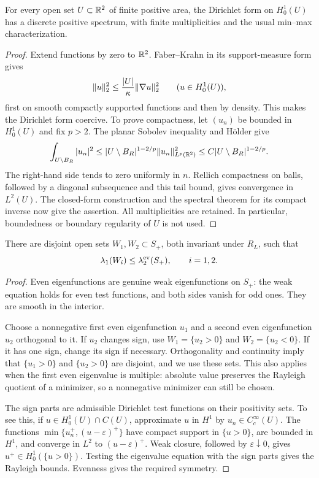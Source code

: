 \begin{lemma}\label{lem:finite-area}
For every open set $U\subset\mathbb R^2$ of finite positive area, the Dirichlet form on $H^1_0(U)$ has a discrete positive spectrum, with finite multiplicities and the usual min--max characterization.
\end{lemma}
\begin{proof}
Extend functions by zero to $\mathbb R^2$. Faber--Krahn in its support-measure form gives
\[
 \lVert u\rVert_2^2\le\frac{|U|}{\kappa}\lVert\nabla u\rVert_2^2
 \qquad(u\in H^1_0(U)),
\]
first on smooth compactly supported functions and then by density. This makes the Dirichlet form coercive. To prove compactness, let $(u_n)$ be bounded in $H^1_0(U)$ and fix $p>2$. The planar Sobolev inequality and H\"older give
\[
 \int_{U\setminus B_R}|u_n|^2
 \le |U\setminus B_R|^{1-2/p}\lVert u_n\rVert_{L^p(\mathbb R^2)}^2
 \le C|U\setminus B_R|^{1-2/p}.
\]
The right-hand side tends to zero uniformly in $n$. Rellich compactness on balls, followed by a diagonal subsequence and this tail bound, gives convergence in $L^2(U)$. The closed-form construction and the spectral theorem for its compact inverse now give the assertion. All multiplicities are retained. In particular, boundedness or boundary regularity of $U$ is not used.
\end{proof}


\begin{lemma}\label{lem:cores}
There are disjoint open sets $W_1,W_2\subset S_+$, both invariant under $R_L$, such that
\[
 \lambda_1(W_i)\le\lambda_2^{\mathrm{ev}}(S_+),\qquad i=1,2.
\]
\end{lemma}
\begin{proof}
Even eigenfunctions are genuine weak eigenfunctions on $S_+$: the weak equation holds for even test functions, and both sides vanish for odd ones. They are smooth in the interior.

Choose a nonnegative first even eigenfunction $u_1$ and a second even eigenfunction $u_2$ orthogonal to it. If $u_2$ changes sign, use $W_1=\{u_2>0\}$ and $W_2=\{u_2<0\}$. If it has one sign, change its sign if necessary. Orthogonality and continuity imply that $\{u_1>0\}$ and $\{u_2>0\}$ are disjoint, and we use these sets. This also applies when the first even eigenvalue is multiple: absolute value preserves the Rayleigh quotient of a minimizer, so a nonnegative minimizer can still be chosen.

The sign parts are admissible Dirichlet test functions on their positivity sets. To see this, if $u\in H^1_0(U)\cap C(U)$, approximate $u$ in $H^1$ by $u_n\in C_c^\infty(U)$. The functions $\min\{u_n^+,(u-\varepsilon)^+\}$ have compact support in $\{u>0\}$, are bounded in $H^1$, and converge in $L^2$ to $(u-\varepsilon)^+$. Weak closure, followed by $\varepsilon\downarrow0$, gives $u^+\in H^1_0(\{u>0\})$. Testing the eigenvalue equation with the sign parts gives the Rayleigh bounds. Evenness gives the required symmetry.
\end{proof}

